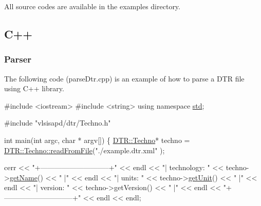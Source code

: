 All source codes are available in the {\ttfamily examples} directory.\hypertarget{dtr_dtrC}{}\subsection{C++}\label{dtr_dtrC}
\hypertarget{dtr_dtrParseC}{}\subsubsection{Parser}\label{dtr_dtrParseC}
The following code ({\ttfamily parse\+Dtr.\+cpp}) is an example of how to parse a D\+TR file using C++ library. 
\begin{DoxyCodeInclude}
\textcolor{preprocessor}{#include <iostream>}
\textcolor{preprocessor}{#include <string>}
\textcolor{keyword}{using namespace }\mbox{\hyperlink{namespacestd}{std}};

\textcolor{preprocessor}{#include "vlsisapd/dtr/Techno.h"}

\textcolor{keywordtype}{int} main(\textcolor{keywordtype}{int} argc, \textcolor{keywordtype}{char} * argv[]) \{
    \mbox{\hyperlink{class_d_t_r_1_1_techno}{DTR::Techno}}* techno = \mbox{\hyperlink{class_d_t_r_1_1_techno_acf863c2bdb7f1aacc4422c8155c60d17}{DTR::Techno::readFromFile}}(\textcolor{stringliteral}{"./example.dtr.xml"}
      );

    cerr << \textcolor{stringliteral}{"+-----------------------------+"} << endl
         << \textcolor{stringliteral}{"| technology:      "} << techno->\mbox{\hyperlink{class_d_t_r_1_1_techno_a3fd7335faa33dce2f87c7e50eef3e294}{getName}}()    <<   \textcolor{stringliteral}{"    |"}   << endl
         << \textcolor{stringliteral}{"| units:           "} << techno->\mbox{\hyperlink{class_d_t_r_1_1_techno_a42e12e8f890c03ebf12e754d7e489dcb}{getUnit}}()    << \textcolor{stringliteral}{"      |"} << endl
         << \textcolor{stringliteral}{"| version:         "} << techno->getVersion() << \textcolor{stringliteral}{"      |"} << endl
         << \textcolor{stringliteral}{"+-----------------------------+"} << endl << endl;


\end{DoxyCodeInclude}
